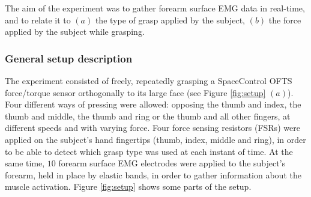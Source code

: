 The aim of the experiment was to gather forearm surface EMG data in
real-time, and to relate it to $(a)$ the type of grasp applied by the
subject, $(b)$ the force applied by the subject while grasping.

\subsubsection{General setup description}

The experiment consisted of freely, repeatedly grasping a SpaceControl
OFTS force/torque sensor \cite{...} orthogonally to its large face
(see Figure \ref{fig:setup} $(a)$). Four different ways of pressing
were allowed: opposing the thumb and index, the thumb and middle, the
thumb and ring or the thumb and all other fingers, at different speeds
and with varying force. Four force sensing resistors (FSRs) were
applied on the subject's hand fingertips (thumb, index, middle and
ring), in order to be able to detect which grasp type was used at each
instant of time. At the same time, $10$ forearm surface EMG electrodes
were applied to the subject's forearm, held in place by elastic bands,
in order to gather information about the muscle activation. Figure
\ref{fig:setup} shows some parts of the setup.

